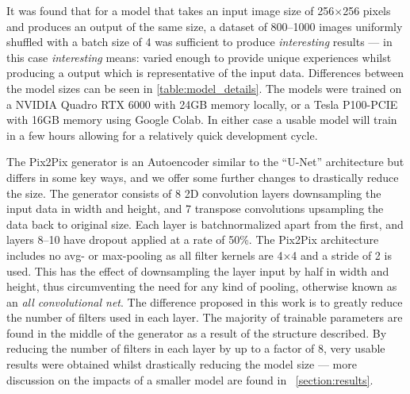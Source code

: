 \documentclass{article}
\begin{document}
It was found that for a model that takes an input image size of 256$\times$256 pixels and produces an output of the same size, a dataset of 800--1000 images uniformly shuffled with a batch size of 4 was sufficient to produce \textit{interesting} results --- in this case \textit{interesting} means: varied enough to provide unique experiences whilst producing a output which is representative of the input data. Differences between the model sizes can be seen in \ref{table:model_details}. The models were trained on a NVIDIA Quadro RTX 6000 with 24GB memory locally, or a Tesla P100-PCIE with 16GB memory using Google Colab. In either case a usable model will train in a few hours allowing for a relatively quick development cycle. %

The Pix2Pix generator is an Autoencoder similar to the ``U-Net'' architecture\cite{1505.04597} but differs in some key ways, and we offer some further changes to drastically reduce the size. The generator consists of 8 2D convolution layers downsampling the input data in width and height, and 7 transpose convolutions upsampling the data back to original size. Each layer is batchnormalized\cite{1502.03167} apart from the first, and layers 8--10 have dropout\cite{JMLR:v15:srivastava14a} applied at a rate of 50\%. The Pix2Pix architecture includes no avg- or max-pooling as all filter kernels are 4$\times$4 and a stride of 2 is used. This has the effect of downsampling the layer input by half in width and height, thus circumventing the need for any kind of pooling, otherwise known as an \textit{all convolutional net}\cite{1412.6806}. The difference proposed in this work is to greatly reduce the number of filters used in each layer. The majority of trainable parameters are found in the middle of the generator as a result of the structure described. By reducing the number of filters in each layer by up to a factor of 8, very usable results were obtained whilst drastically reducing the model size --- more discussion on the impacts of a smaller model are found in ~\ref{section:results}.
\end{document}

